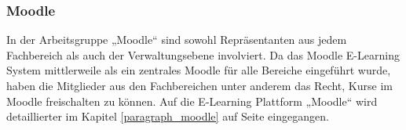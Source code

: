 \subsubsection{Moodle}
In der Arbeitsgruppe „Moodle“ sind sowohl Repräsentanten aus jedem Fachbereich als auch der Verwaltungsebene involviert. Da das Moodle E-Learning System mittlerweile als ein zentrales Moodle für alle Bereiche eingeführt wurde, haben die Mitglieder aus den Fachbereichen unter anderem das Recht, Kurse im Moodle freischalten zu können. Auf die E-Learning Plattform „Moodle“ wird detaillierter im Kapitel \ref{paragraph_moodle} auf Seite \pageref{paragraph_moodle} eingegangen.
